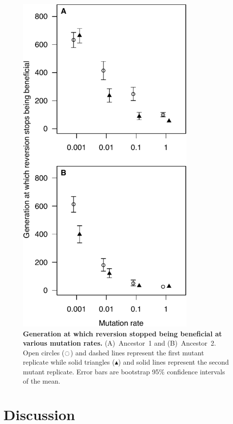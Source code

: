 \begin{doublespace}
\begin{figure}
\begin{center}
\includegraphics[width=3.5in]{first-update-rev-bad-U.pdf}
\end{center}
\caption{
  {\bf Generation at which reversion stopped being beneficial
  at various mutation rates.}
  (A)~Ancestor~1 and (B)~Ancestor~2.
  Open circles ($\ocircle$) and dashed lines
  represent the first mutant replicate
  while solid triangles ($\blacktriangle$) and solid lines
  represent the second mutant replicate.
  Error bars are bootstrap 95\% confidence intervals of the mean.}
\label{fig:first-update-rev-bad-U}
\end{figure}



\section{Discussion}


\end{doublespace}
